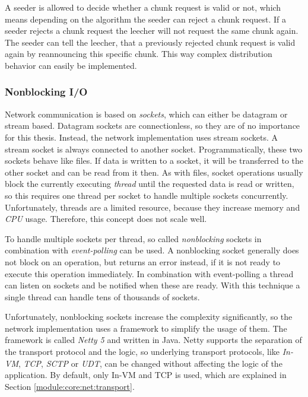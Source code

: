 A seeder is allowed to decide whether a chunk request is valid or not, which means depending on the algorithm the seeder can reject a chunk request. If a seeder rejects a chunk request the leecher will not request the same chunk again. The seeder can tell the leecher, that a previously rejected chunk request is valid again by reannouncing this specific chunk. This way complex distribution behavior
can easily be implemented.


\subsubsection{Nonblocking I/O}
Network communication is based on \emph{sockets}, which can either be datagram or stream based. Datagram sockets are connectionless, so they are of no importance for this thesis. Instead, the network implementation uses stream sockets. A stream socket is always connected to another socket. Programmatically, these two sockets behave like files. If data is written to a socket, it will be transferred to the other socket and can be read from it then. As with files, socket operations usually block the currently executing \emph{thread} until the requested data is read or written, so this requires one thread per socket to handle multiple sockets concurrently. Unfortunately, threads are a limited resource, because they increase memory and \emph{CPU} usage. Therefore, this concept does not scale well.

To handle multiple sockets per thread, so called \emph{nonblocking} sockets in combination with \emph{event-polling} can be used. A nonblocking socket generally does not block on an operation, but returns an error instead, if it is not ready to execute this operation immediately. In combination with event-polling a thread can listen on sockets and be notified when these are ready. With this technique a single thread can handle tens of thousands of sockets.

Unfortunately, nonblocking sockets increase the complexity significantly, so the network implementation uses a framework to simplify the usage of them. The framework is called \emph{Netty 5} and written in Java. Netty supports the separation of the transport protocol and the logic, so underlying transport protocols, like \emph{In-VM}, \emph{TCP}, \emph{SCTP} or \emph{UDT}, can be changed without affecting the logic of the application. By default, only In-VM and TCP is used, which are explained in Section \ref{module:core:net:transport}.

